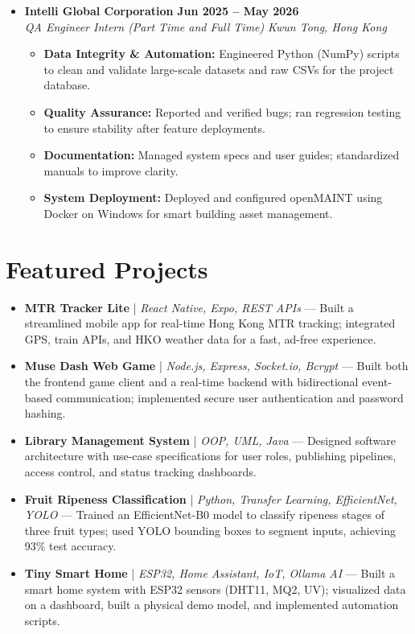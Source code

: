 \documentclass[a4paper,10pt]{article}
\begin{document}
\begin{itemize}[leftmargin=*, label={}, itemsep=1pt]
    \item \textbf{Intelli Global Corporation} \hfill \textbf{Jun 2025 -- May 2026} \\
    \textit{QA Engineer Intern (Part Time and Full Time)} \hfill \textit{Kwun Tong, Hong Kong}
    \begin{itemize}[leftmargin=1.2em, label={--}, itemsep=0pt, topsep=1pt]
        \item \textbf{Data Integrity \& Automation:} Engineered Python (NumPy) scripts to clean and validate large-scale datasets and raw CSVs for the project database.
        \item \textbf{Quality Assurance:} Reported and verified bugs; ran regression testing to ensure stability after feature deployments.
        \item \textbf{Documentation:} Managed system specs and user guides; standardized manuals to improve clarity.
        \item \textbf{System Deployment:} Deployed and configured openMAINT using Docker on Windows for smart building asset management.
    \end{itemize}
\end{itemize}

\section{Featured Projects}
\begin{itemize}[leftmargin=*, label={}, itemsep=2pt]
    \item \textbf{MTR Tracker Lite} | \textit{React Native, Expo, REST APIs} — Built a streamlined mobile app for real-time Hong Kong MTR tracking; integrated GPS, train APIs, and HKO weather data for a fast, ad-free experience.
    \item \textbf{Muse Dash Web Game} | \textit{Node.js, Express, Socket.io, Bcrypt} — Built both the frontend game client and a real-time backend with bidirectional event-based communication; implemented secure user authentication and password hashing.
    \item \textbf{Library Management System} | \textit{OOP, UML, Java} — Designed software architecture with use-case specifications for user roles, publishing pipelines, access control, and status tracking dashboards.
    \item \textbf{Fruit Ripeness Classification} | \textit{Python, Transfer Learning, EfficientNet, YOLO} — Trained an EfficientNet-B0 model to classify ripeness stages of three fruit types; used YOLO bounding boxes to segment inputs, achieving 93\% test accuracy.
    \item \textbf{Tiny Smart Home} | \textit{ESP32, Home Assistant, IoT, Ollama AI} — Built a smart home system with ESP32 sensors (DHT11, MQ2, UV); visualized data on a dashboard, built a physical demo model, and implemented automation scripts.
\end{itemize}
\end{document}
